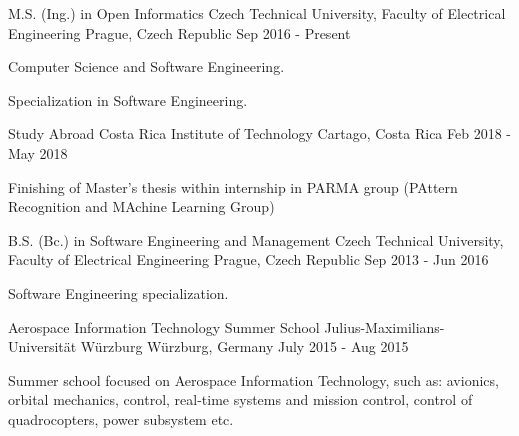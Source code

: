 \begin{cventries}
  \cventry
    {M.S. (Ing.) in Open Informatics}
    {Czech Technical University, Faculty of Electrical Engineering}
    {Prague, Czech Republic}
    {Sep 2016 - Present}
    {
      \begin{cvitems}
        \item {Computer Science and Software Engineering.}
        \item {Specialization in Software Engineering.}
      \end{cvitems}
    }

    \cventry
    {Study Abroad}
    {Costa Rica Institute of Technology}
    {Cartago, Costa Rica}
    {Feb 2018 - May 2018}
    {
      \begin{cvitems}
        \item {Finishing of Master's thesis within internship in PARMA group (PAttern Recognition and MAchine Learning Group)}
      \end{cvitems}
    }

  \cventry
    {B.S. (Bc.) in Software Engineering and Management}
    {Czech Technical University, Faculty of Electrical Engineering}
    {Prague, Czech Republic}
    {Sep 2013 - Jun 2016}
    {
      \begin{cvitems}
        \item {Software Engineering specialization.}
      \end{cvitems}
    }

  \cventry
    {Aerospace Information Technology Summer School}
    {Julius-Maximilians-Universität Würzburg}
    {Würzburg, Germany}
    {July 2015 - Aug 2015}
     {
      \begin{cvitems}
        \item {Summer school focused on Aerospace Information Technology, such as: avionics, orbital mechanics, control, real-time systems and mission control, control of quadrocopters, power subsystem etc.}
      \end{cvitems}
    }
\end{cventries}
